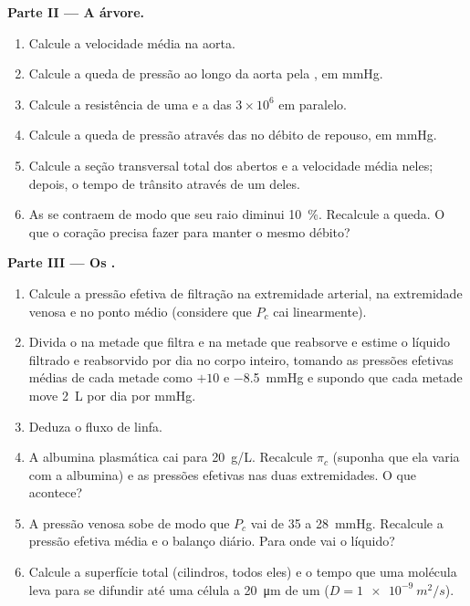 \begin{problem}
\medskip
\noindent\textbf{Parte II --- A árvore.}
\begin{enumerate}[resume]
  \item Calcule a velocidade média na aorta.
  \item Calcule a queda de pressão ao longo da aorta pela , em mmHg.
  \item Calcule a resistência de uma  e a das $3\times
        10^{6}$ em paralelo.
  \item Calcule a queda de pressão através das  no débito de
        repouso, em mmHg.
  \item Calcule a seção transversal total dos  abertos e a
        velocidade média neles; depois, o tempo de trânsito através de
        um deles.
  \item As  se contraem de modo que seu raio diminui
        \qty{10}{\%}. Recalcule a queda. O que o coração precisa fazer
        para manter o mesmo débito?
\end{enumerate}

\medskip
\noindent\textbf{Parte III --- Os .}
\begin{enumerate}[resume]
  \item Calcule a pressão efetiva de filtração na extremidade arterial,
        na extremidade venosa e no ponto médio (considere que $P_c$ cai
        linearmente).
  \item Divida o  na metade que filtra e na metade que reabsorve
        e estime o líquido filtrado e reabsorvido por dia no corpo
        inteiro, tomando as pressões efetivas médias de cada metade como
        $+10$ e \qty{-8.5}{mmHg} e supondo que cada metade move
        \qty{2}{L} por dia por mmHg.
  \item Deduza o fluxo de linfa.
  \item A albumina plasmática cai para \qty{20}{g/L}. Recalcule $\pi_c$
        (suponha que ela varia com a albumina) e as pressões efetivas nas
        duas extremidades. O que acontece?
  \item A pressão venosa sobe de modo que $P_c$ vai de 35 a
        \qty{28}{mmHg}. Recalcule a pressão efetiva média e o balanço
        diário. Para onde vai o líquido?
  \item Calcule a superfície  total (cilindros, todos eles) e o
        tempo que uma molécula leva para se difundir até uma célula a
        \qty{20}{\micro m} de um  ($D = \qty{1e-9}{m^2/s}$).
\end{enumerate}


\end{problem}

